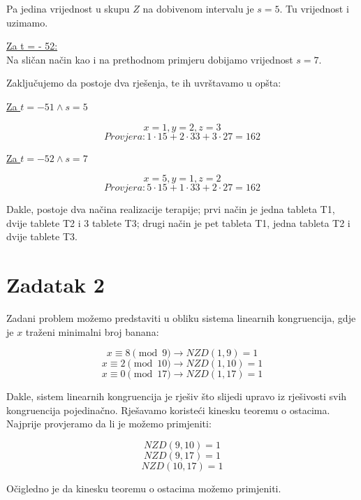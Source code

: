 \documentclass[12pt]{article}
\begin{document}
Pa jedina vrijednost u skupu $Z$ na dobivenom intervalu je $s = 5$. Tu vrijednost i uzimamo.\vspace{1mm}

\underline{Za t = - 52:}\\

Na sličan način kao i na prethodnom primjeru dobijamo vrijednost $s = 7$.\vspace{1mm}

Zaključujemo da postoje dva rješenja, te ih uvrštavamo u opšta:\vspace{1mm}

\underline{Za $t = - 51 \land s = 5$}\vspace{1mm}

$$x = 1, y = 2, z = 3$$
$$Provjera: 1 \cdot 15 + 2 \cdot 33 + 3 \cdot 27 = 162$$\vspace{1mm}

\underline{Za $t = - 52 \land s = 7$}

$$x = 5, y = 1, z = 2$$
$$Provjera: 5 \cdot 15 + 1 \cdot 33 + 2 \cdot 27 = 162$$\vspace{1mm}

Dakle, postoje dva načina realizacije terapije; prvi način je jedna tableta T1, dvije tablete T2 i 3 tablete T3; drugi način je pet tableta T1, jedna tableta T2 i dvije tablete T3.

\newpage

\section*{Zadatak 2\label{Z2}}

\hspace{0.65cm}Zadani problem možemo predstaviti u obliku sistema linearnih kongruencija, gdje je $x$ traženi minimalni broj banana:

$$x \equiv 8 \pmod{9} \to NZD(1, 9) = 1$$
$$x \equiv 2 \pmod{10} \to NZD(1, 10) = 1$$
$$x \equiv 0 \pmod{17} \to NZD(1, 17) = 1$$\vspace{1mm}

Dakle, sistem linearnih kongruencija je rješiv što slijedi upravo iz rješivosti svih kongruencija pojedinačno. Rješavamo koristeći kinesku teoremu o ostacima. Najprije provjeramo da li je možemo primjeniti: 

$$NZD(9, 10) = 1$$
$$NZD(9, 17) = 1$$
$$NZD(10, 17) = 1$$\vspace{1mm}

Očigledno je da kinesku teoremu o ostacima možemo primjeniti.
\end{document}
